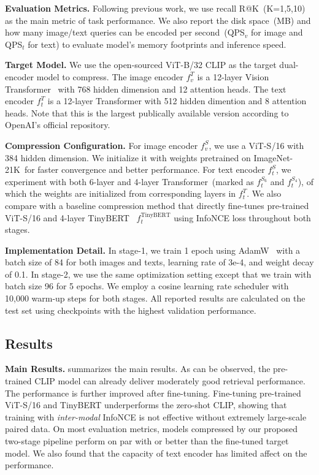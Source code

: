 \noindent
\textbf{Evaluation Metrics. }Following previous work, we use recall R@K~(K=1,5,10) as the main metric of task performance. We also report the disk space~(MB) and how many image/text queries can be encoded per second~(QPS$_v$ for image and QPS$_t$ for text) to evaluate model's memory footprints and inference speed.

\noindent
\textbf{Target Model.} We use the open-sourced ViT-B/32 CLIP as the target dual-encoder model to compress. The image encoder $f_v^{T}$ is a 12-layer Vision Transformer~\cite{vit} with 768 hidden dimension and 12 attention heads. The text encoder $f_t^{T}$ is a 12-layer Transformer with 512 hidden dimention and 8 attention heads. Note that this is the largest publically available version according to OpenAI's official repository.

\noindent
\textbf{Compression Configuration.} For image encoder $f_v^{S}$, we use a ViT-S/16 with 384 hidden dimension. We initialize it with weights pretrained on ImageNet-21K~\cite{imagenet21k}for faster convergence and better performance. For text encoder $f_t^{S}$, we experiment with both 6-layer and 4-layer Transformer~(marked as $f_t^{S_6}$ and $f_t^{S_4}$), of which the weights are initialized from corresponding layers in $f_t^{T}$. We also compare with 
a baseline compression method that directly fine-tunes pre-trained ViT-S/16 and 4-layer TinyBERT~\cite{tinybert} $f_t^{\text{TinyBERT}}$ using InfoNCE loss throughout both stages.

\textbf{Implementation Detail.} In stage-1, we train 1 epoch using AdamW~\cite{adamw} with a batch size of 84 for both images and texts, learning rate of 3e-4, and weight decay of 0.1. In stage-2, we use the same optimization setting except that we train with batch size 96 for 5 epochs. We employ a cosine learning rate scheduler with 10,000 warm-up steps for both stages. All reported results are calculated on the test set using checkpoints with the highest validation performance.

\subsection{Results}



\textbf{Main Results.}  summarizes the main results. As can be observed, the pre-trained CLIP model can already deliver moderately good retrieval performance. The performance is further improved after fine-tuning. Fine-tuning pre-trained ViT-S/16 and TinyBERT underperforms the zero-shot CLIP, showing that training with \textit{inter-modal} InfoNCE is not effective without extremely large-scale paired data. On most evaluation metrics, models compressed by our proposed two-stage pipeline perform on par with or better than the fine-tuned target model. We also found that the capacity of text encoder has limited affect on the performance.




